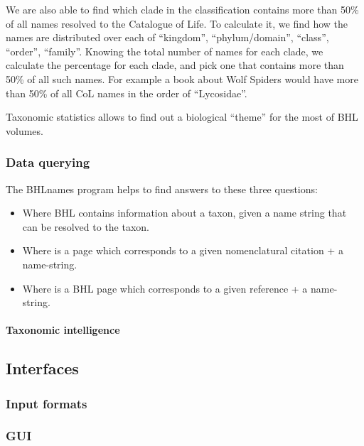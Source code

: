 \documentclass[
]{article}
\providecommand{\tightlist}{%
  \setlength{\itemsep}{0pt}\setlength{\parskip}{0pt}}
\begin{document}
We are also able to find which clade in the classification contains more
than 50\% of all names resolved to the Catalogue of Life. To calculate
it, we find how the names are distributed over each of ``kingdom'',
``phylum/domain'', ``class'', ``order'', ``family''. Knowing the total
number of names for each clade, we calculate the percentage for each
clade, and pick one that contains more than 50\% of all such names. For
example a book about Wolf Spiders would have more than 50\% of all CoL
names in the order of ``Lycosidae''.

Taxonomic statistics allows to find out a biological ``theme'' for the
most of BHL volumes.

\hypertarget{data-querying}{%
\subsubsection{Data querying}\label{data-querying}}

The BHLnames program helps to find answers to these three questions:

\begin{itemize}
\tightlist
\item
  Where BHL contains information about a taxon, given a name string that
  can be resolved to the taxon.
\item
  Where is a page which corresponds to a given nomenclatural citation +
  a name-string.
\item
  Where is a BHL page which corresponds to a given reference + a
  name-string.
\end{itemize}

\hypertarget{taxonomic-intelligence}{%
\paragraph{Taxonomic intelligence}\label{taxonomic-intelligence}}

\hypertarget{interfaces}{%
\subsection{Interfaces}\label{interfaces}}

\hypertarget{input-formats}{%
\subsubsection{Input formats}\label{input-formats}}

\hypertarget{gui}{%
\subsubsection{GUI}\label{gui}}
\end{document}
